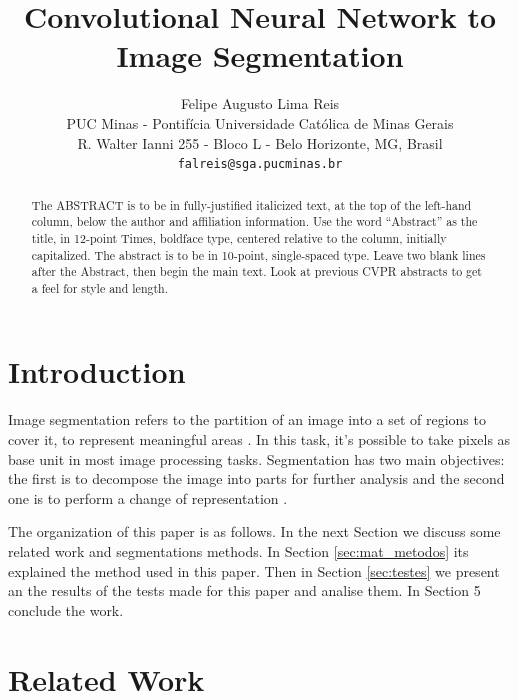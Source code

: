 \documentclass[10pt,twocolumn,letterpaper]{article}
\begin{document}
\title{Convolutional Neural Network to Image Segmentation}

\author{Felipe Augusto Lima Reis\\
PUC Minas - Pontif\'icia Universidade Cat\'olica de Minas Gerais\\
R. Walter Ianni 255 - Bloco L - Belo Horizonte, MG, Brasil\\
{\tt\small falreis@sga.pucminas.br}
}

\maketitle

\begin{abstract}
   The ABSTRACT is to be in fully-justified italicized text, at the top
   of the left-hand column, below the author and affiliation
   information. Use the word ``Abstract'' as the title, in 12-point
   Times, boldface type, centered relative to the column, initially
   capitalized. The abstract is to be in 10-point, single-spaced type.
   Leave two blank lines after the Abstract, then begin the main text.
   Look at previous CVPR abstracts to get a feel for style and length.
\end{abstract}

\section{Introduction}

Image segmentation refers to the partition of an image into a set of regions to cover it, to represent meaningful areas \cite{DOMINGUEZ}. In this task, it's possible to take pixels as base unit in most image processing tasks\cite{WANG201728}. Segmentation has two main objectives: the first is to decompose the image into parts for further analysis and the second one is to perform a change of representation \cite{DOMINGUEZ}.

The organization of this paper is as follows. In the next Section we discuss some related work and segmentations methods.  In Section \ref{sec:mat_metodos} its explained the method used in this paper. Then in Section \ref{sec:testes} we present an the results of the tests made for this paper and analise them. In Section 5 conclude the work.

\section{Related Work} \label{sec:ref_teorico}
\end{document}
